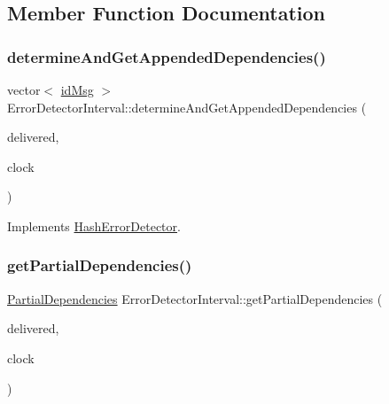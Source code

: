 \subsection{Member Function Documentation}
\mbox{\label{class_error_detector_interval_a6cb5dc28ef7349060d15727e92a6780a}} 
\subsubsection{\texorpdfstring{determine\+And\+Get\+Appended\+Dependencies()}{determineAndGetAppendedDependencies()}}
{\footnotesize\ttfamily vector$<$ \hyperlink{structures_8h_a83a1d9a070efa5341da84cfd8e28d3e5}{id\+Msg} $>$ Error\+Detector\+Interval\+::determine\+And\+Get\+Appended\+Dependencies (\begin{DoxyParamCaption}\item[{const vector$<$ \hyperlink{structures_8h_a7e7bdc1d2fff8a9436f2f352b2711ed6}{message\+Info} $>$ \&}]{delivered,  }\item[{const \hyperlink{class_probabilistic_clock}{Probabilistic\+Clock} \&}]{clock }\end{DoxyParamCaption})\hspace{0.3cm}{\ttfamily [virtual]}}



Implements \hyperlink{class_hash_error_detector_ae45353331e29b50a0aa2fc6dd540ed4e}{Hash\+Error\+Detector}.

\mbox{\label{class_error_detector_interval_a9494a918f551eb1efcab39ffd68316d6}} 
\subsubsection{\texorpdfstring{get\+Partial\+Dependencies()}{getPartialDependencies()}}
{\footnotesize\ttfamily \hyperlink{class_partial_dependencies}{Partial\+Dependencies} Error\+Detector\+Interval\+::get\+Partial\+Dependencies (\begin{DoxyParamCaption}\item[{const vector$<$ \hyperlink{structures_8h_a7e7bdc1d2fff8a9436f2f352b2711ed6}{message\+Info} $>$ \&}]{delivered,  }\item[{const \hyperlink{class_probabilistic_clock}{Probabilistic\+Clock} \&}]{clock }\end{DoxyParamCaption})\hspace{0.3cm}{\ttfamily [virtual]}}



